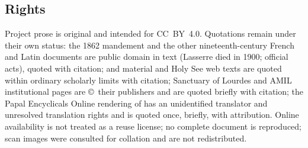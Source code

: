 \subsection*{Rights}

Project prose is original and intended for CC~BY~4.0. Quotations
remain under their own status: the 1862 mandement and the other
nineteenth-century French and Latin documents are public domain
in text (Lasserre died in 1900; official acts), quoted with
citation;  and  material and Holy See web texts are quoted within
ordinary scholarly limits with citation; Sanctuary of Lourdes
and AMIL institutional pages are \copyright\ their publishers
and are quoted briefly with citation; the Papal Encyclicals
Online rendering of  has an unidentified
translator and unresolved translation rights and is quoted once,
briefly, with attribution. Online availability is not treated as
a reuse license; no complete document is reproduced; scan images
were consulted for collation and are not redistributed.
